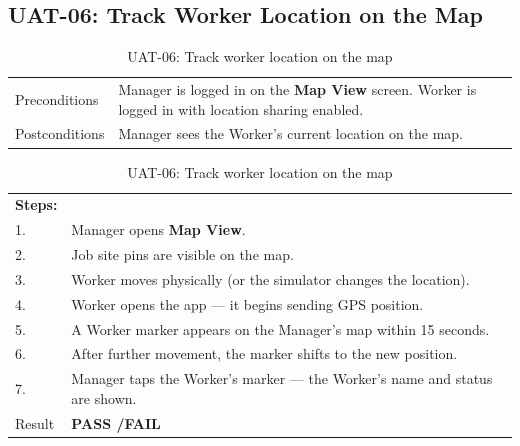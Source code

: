 \subsection*{UAT-06: Track Worker Location on the Map}
\begin{table}[H]
  \centering
  \begin{tabularx}{\textwidth}{lX}
    \toprule
    Preconditions  & Manager is logged in on the \textbf{Map View} screen. Worker is logged in with location sharing enabled. \\
    Postconditions & Manager sees the Worker's current location on the map. \\
    \midrule
  \end{tabularx}
  \begin{tabularx}{\textwidth}{lX}
    \textbf{Steps:} & \\
    1. & Manager opens \textbf{Map View}. \\
    2. & Job site pins are visible on the map. \\
    3. & Worker moves physically (or the simulator changes the location). \\
    4. & Worker opens the app --- it begins sending GPS position. \\
    5. & A Worker marker appears on the Manager's map within 15 seconds. \\
    6. & After further movement, the marker shifts to the new position. \\
    7. & Manager taps the Worker's marker --- the Worker's name and status are shown. \\
    \midrule
    Result & \textbf{PASS \quad/\quad FAIL} \\
    \bottomrule
  \end{tabularx}
  \caption{UAT-06: Track worker location on the map}
\end{table}

